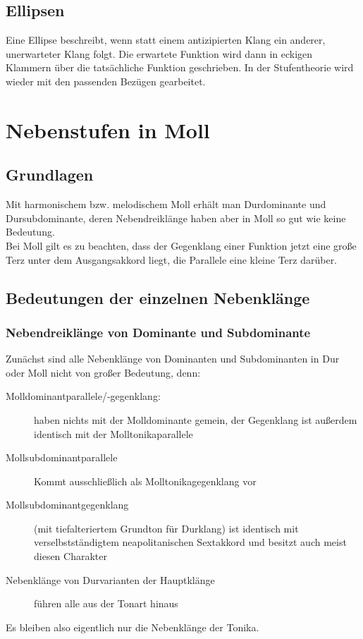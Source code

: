 \documentclass[a4paper]{article}
\begin{document}
	\subsection{Ellipsen}
	Eine Ellipse beschreibt, wenn statt einem antizipierten Klang ein anderer, unerwarteter Klang folgt. Die erwartete Funktion wird dann in eckigen Klammern über die tatsächliche Funktion geschrieben. In der Stufentheorie wird wieder mit den passenden Bezügen gearbeitet.
	
	\section{Nebenstufen in Moll}
	\subsection{Grundlagen}
	Mit harmonischem bzw. melodischem Moll erhält man Durdominante und Dursubdominante, deren Nebendreiklänge haben aber in Moll so gut wie keine Bedeutung.\\
	Bei Moll gilt es zu beachten, dass der Gegenklang einer Funktion jetzt eine große Terz unter dem Ausgangsakkord liegt, die Parallele eine kleine Terz darüber.\\
	
	\subsection{Bedeutungen der einzelnen Nebenklänge}
	\subsubsection{Nebendreiklänge von Dominante und Subdominante}
	Zunächst sind alle Nebenklänge von Dominanten und Subdominanten in Dur oder Moll nicht von großer Bedeutung, denn:
	\begin{description}
		\item[Molldominantparallele/-gegenklang:] haben nichts mit der Molldominante gemein, der Gegenklang ist außerdem identisch mit der Molltonikaparallele
		\item[Mollsubdominantparallele] Kommt ausschließlich als Molltonikagegenklang vor
		\item[Mollsubdominantgegenklang] (mit tiefalteriertem Grundton für Durklang) ist identisch mit verselbstständigtem neapolitanischen Sextakkord und besitzt auch meist diesen Charakter
		\item[Nebenklänge von Durvarianten der Hauptklänge] führen alle aus der Tonart hinaus
	\end{description}
	Es bleiben also eigentlich nur die Nebenklänge der Tonika.
	
\end{document}
